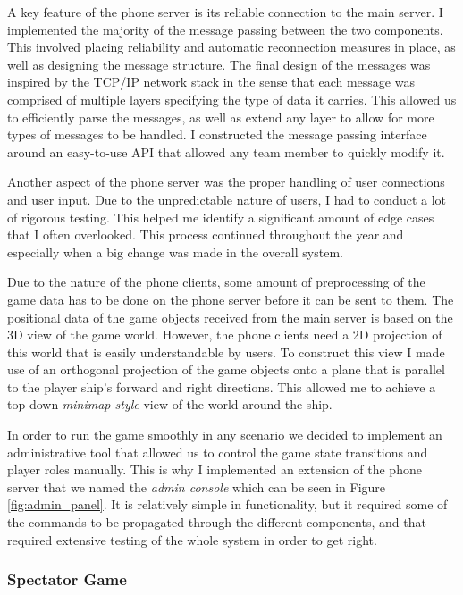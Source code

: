 \documentclass[a4paper,11pt]{article}
\begin{document}
A key feature of the phone server is its reliable connection to the main server. I implemented the majority of the message passing between the two components. This involved placing reliability and automatic reconnection measures in place, as well as designing the message structure. The final design of the messages was inspired by the TCP/IP network stack in the sense that each message was comprised of multiple layers specifying the type of data it carries. This allowed us to efficiently parse the messages, as well as extend any layer to allow for more types of messages to be handled. I constructed the message passing interface around an easy-to-use API that allowed any team member to quickly modify it.

Another aspect of the phone server was the proper handling of user connections and user input. Due to the unpredictable nature of users, I had to conduct a lot of rigorous testing. This helped me identify a significant amount of edge cases that I often overlooked. This process continued throughout the year and especially when a big change was made in the overall system.

Due to the nature of the phone clients, some amount of preprocessing of the game data has to be done on the phone server before it can be sent to them. The positional data of the game objects received from the main server is based on the 3D view of the game world. However, the phone clients need a 2D projection of this world that is easily understandable by users. To construct this view I made use of an orthogonal projection of the game objects onto a plane that is parallel to the player ship's forward and right directions. This allowed me to achieve a top-down \emph{minimap-style} view of the world around the ship.

In order to run the game smoothly in any scenario we decided to implement an administrative tool that allowed us to control the game state transitions and player roles manually. This is why I implemented an extension of the phone server that we named the \emph{admin console} which can be seen in Figure \ref{fig:admin_panel}. It is relatively simple in functionality, but it required some of the commands to be propagated through the different components, and that required extensive testing of the whole system in order to get right.

\subsubsection{Spectator Game}
\end{document}
